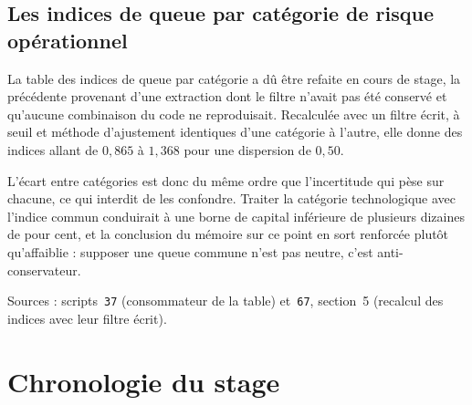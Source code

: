 \documentclass[12pt,a4paper]{article}
\theoremstyle{definition}
\begin{document}
\subsection*{Les indices de queue par catégorie de risque opérationnel}

La table des indices de queue par catégorie a dû être refaite en cours de stage,
la précédente provenant d'une extraction dont le filtre n'avait pas été conservé et
qu'aucune combinaison du code ne reproduisait. Recalculée avec un filtre écrit, à
seuil et méthode d'ajustement identiques d'une catégorie à l'autre, elle donne des
indices allant de $0{,}865$ à $1{,}368$ pour une dispersion de $0{,}50$.

L'écart entre catégories est donc du même ordre que l'incertitude qui pèse sur
chacune, ce qui interdit de les confondre. Traiter la catégorie technologique avec
l'indice commun conduirait à une borne de capital inférieure de plusieurs dizaines
de pour cent, et la conclusion du mémoire sur ce point en sort renforcée plutôt
qu'affaiblie : supposer une queue commune n'est pas neutre, c'est
anti-conservateur.

\vspace{4pt}
\noindent Sources : scripts~\texttt{37} (consommateur de la table) et~\texttt{67},
section~5 (recalcul des indices avec leur filtre écrit).

\section{Chronologie du stage}
\label{ann:chronologie}

\end{document}
